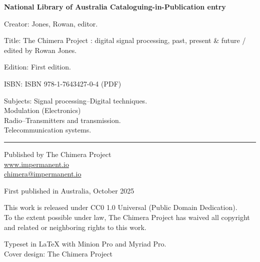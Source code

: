 \newpage
\thispagestyle{empty}

\vspace*{5cm}

\begin{flushleft}

{\small
\textbf{National Library of Australia Cataloguing-in-Publication entry}

\vspace{0.5cm}

Creator: Jones, Rowan, editor.

\vspace{0.3cm}

Title: The Chimera Project : digital signal processing, past, present \& future / edited by Rowan Jones.

\vspace{0.3cm}

Edition: First edition.

\vspace{0.3cm}

ISBN: ISBN 978-1-7643427-0-4 (PDF)

\vspace{0.3cm}

Subjects: Signal processing--Digital techniques.\\
\hspace*{2em}Modulation (Electronics)\\
\hspace*{2em}Radio--Transmitters and transmission.\\
\hspace*{2em}Telecommunication systems.

\vspace{1cm}

\rule{0.3\textwidth}{0.4pt}

\vspace{0.5cm}

Published by The Chimera Project\\
\url{www.impermanent.io}\\
\href{mailto:chimera@impermanent.io}{chimera@impermanent.io}

\vspace{0.5cm}

First published in Australia, October 2025

\vspace{0.5cm}

This work is released under CC0 1.0 Universal (Public Domain Dedication).\\
To the extent possible under law, The Chimera Project has waived all copyright\\
and related or neighboring rights to this work.

\vspace{0.5cm}

Typeset in \LaTeX{} with Minion Pro and Myriad Pro.\\
Cover design: The Chimera Project

}

\end{flushleft}

\newpage
